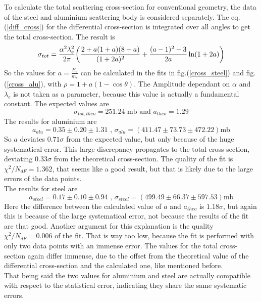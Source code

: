 \documentclass{article}
\begin{document}
To calculate the total scattering cross-section for conventional geometry, the data of the steel and aluminium scattering body is considered separately. The eq.(\ref{diff_cross}) for the differential cross-section is integrated over all angles to get the total cross-section. The result is
\begin{equation*}
    \sigma_{tot} = \frac{\alpha^2\lambda^2_e}{2\pi}\qty(\frac{2+a(1+a)(8+a)}{(1+2a)^2}+\frac{(a-1)^2-3}{2a}\ln(1+2a))
\end{equation*}
So the values for $a = \frac{E_\gamma}{m_e}$ can be calculated in the fits in fig.(\ref{cross_steel}) and fig.(\ref{cross_alu}), with $\rho = 1+a(1-\cos{\theta})$. The Amplitude dependant on $\alpha$ and $\lambda_e$ is not taken as a parameter, because this value is actually a fundamental constant. The expected values are
\begin{equation*}
    \sigma_{tot, theo} = 251.24\mbox{ mb and } a_{theo} = 1.29
\end{equation*}
The results for aluminium are
\begin{equation*}
    a_{alu} = 0.35 \pm  0.20 \pm  1.31 \mbox{ , } \sigma_{alu} = (411.47 \pm  73.73 \pm 472.22)\mbox{mb}
\end{equation*}
So $a$ deviates $0.71 \sigma$ from the expected value, but only because of the huge systematical error.
This large discrepancy propagates to the total cross-section, deviating $0.33 \sigma$ from the theoretical cross-section.
The quality of the fit is $\chi^2/N_{dF} =1.362$, that seems like a good result, but that is likely due to the large errors of the data points.\\
The results for steel are
\begin{equation*}
    a_{steel} =  0.17 \pm  0.10 \pm  0.94 \mbox{ , } \sigma_{steel} =(499.49 \pm  66.37 \pm 597.53)\mbox{mb}
\end{equation*}
Here the difference between the calculated value of $a$ and $a_{theo}$ is $1.18 \sigma$, but again this is because of the large systematical error, not because the results of the fit are that good.
Another argument for this explanation is the quality $\chi^2/N_{dF} = 0.006$ of the fit. That is way too low, because the fit is performed with only two data points with an immense error.
The values for the total cross-section again differ immense, due to the offset from the theoretical value of the differential cross-section and the calculated one, like mentioned before.\\
That being said the two values for aluminium and steel are actually compatible with respect to the statistical error, indicating they share the same systematic errors.
\end{document}
